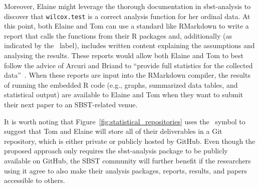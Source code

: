 Moreover, Elaine might leverage the thorough documentation in sbst-analysis to discover that {\tt wilcox.test} is a
correct analysis function for her ordinal data. At this point, both Elaine and Tom can use a standard like RMarkdown to
write a report that calls the functions from their R packages and, additionally (as indicated by the
\codeeditgit~label), includes written content explaining the assumptions and analysing the results. These reports would
allow both Elaine and Tom to best follow the advice of Arcuri and Briand to ``provide full statistics for the collected
data''~\cite{Arcuri2014}. When these reports are input into the RMarkdown compiler, the results of running the
embedded R code (e.g., graphs, summarized data tables, and statistical output) are available to Elaine and Tom when they
want to submit their next paper to an SBST-related venue.

It is worth noting that Figure~\ref{fig:statistical_repositories} uses the \faGit~symbol to suggest that Tom and Elaine
will store all of their deliverables in a Git repository, which is either private or publicly hosted by GitHub. Even though
the proposed approach only requires the sbst-analysis package to be publicly available on GitHub, the SBST community will further
benefit if the researchers using it agree to also make their analysis packages, reports, results, and papers accessible
to others.
